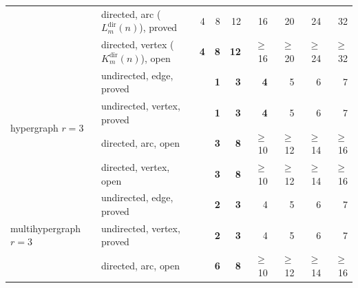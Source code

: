 \begin{tabular}{llrrrrrrr}
 & directed, arc ($L_m^{\mathrm{dir}}(n)$), \textcolor{vtProved}{proved} & \textcolor{vtProved}{4} & \textcolor{vtProved}{8} & \textcolor{vtProved}{12} & \textcolor{vtProved}{16} & \textcolor{vtProved}{20} & \textcolor{vtProved}{24} & \textcolor{vtProved}{32} \\
 & directed, vertex ($K_m^{\mathrm{dir}}(n)$), \textcolor{vtOpen}{open} & \textcolor{vtExact}{\textbf{4}} & \textcolor{vtExact}{\textbf{8}} & \textcolor{vtExact}{\textbf{12}} & \textcolor{vtOpen}{$\ge$16} & \textcolor{vtOpen}{$\ge$20} & \textcolor{vtOpen}{$\ge$24} & \textcolor{vtOpen}{$\ge$32} \\
\midrule
\multirow{4}{*}{hypergraph $r=3$} & undirected, edge, \textcolor{vtProved}{proved} &  & \textcolor{vtExact}{\textbf{1}} & \textcolor{vtExact}{\textbf{3}} & \textcolor{vtExact}{\textbf{4}} & \textcolor{vtProved}{5} & \textcolor{vtProved}{6} & \textcolor{vtProved}{7} \\
 & undirected, vertex, \textcolor{vtProved}{proved} &  & \textcolor{vtExact}{\textbf{1}} & \textcolor{vtExact}{\textbf{3}} & \textcolor{vtExact}{\textbf{4}} & \textcolor{vtProved}{5} & \textcolor{vtProved}{6} & \textcolor{vtProved}{7} \\
 & directed, arc, \textcolor{vtOpen}{open} &  & \textcolor{vtExact}{\textbf{3}} & \textcolor{vtExact}{\textbf{8}} & \textcolor{vtOpen}{$\ge$10} & \textcolor{vtOpen}{$\ge$12} & \textcolor{vtOpen}{$\ge$14} & \textcolor{vtOpen}{$\ge$16} \\
 & directed, vertex, \textcolor{vtOpen}{open} &  & \textcolor{vtExact}{\textbf{3}} & \textcolor{vtExact}{\textbf{8}} & \textcolor{vtOpen}{$\ge$10} & \textcolor{vtOpen}{$\ge$12} & \textcolor{vtOpen}{$\ge$14} & \textcolor{vtOpen}{$\ge$16} \\
\midrule
\multirow{4}{*}{multihypergraph $r=3$} & undirected, edge, \textcolor{vtProved}{proved} &  & \textcolor{vtExact}{\textbf{2}} & \textcolor{vtExact}{\textbf{3}} & \textcolor{vtProved}{4} & \textcolor{vtProved}{5} & \textcolor{vtProved}{6} & \textcolor{vtProved}{7} \\
 & undirected, vertex, \textcolor{vtProved}{proved} &  & \textcolor{vtExact}{\textbf{2}} & \textcolor{vtExact}{\textbf{3}} & \textcolor{vtProved}{4} & \textcolor{vtProved}{5} & \textcolor{vtProved}{6} & \textcolor{vtProved}{7} \\
 & directed, arc, \textcolor{vtOpen}{open} &  & \textcolor{vtExact}{\textbf{6}} & \textcolor{vtExact}{\textbf{8}} & \textcolor{vtOpen}{$\ge$10} & \textcolor{vtOpen}{$\ge$12} & \textcolor{vtOpen}{$\ge$14} & \textcolor{vtOpen}{$\ge$16} \\

\end{tabular}
